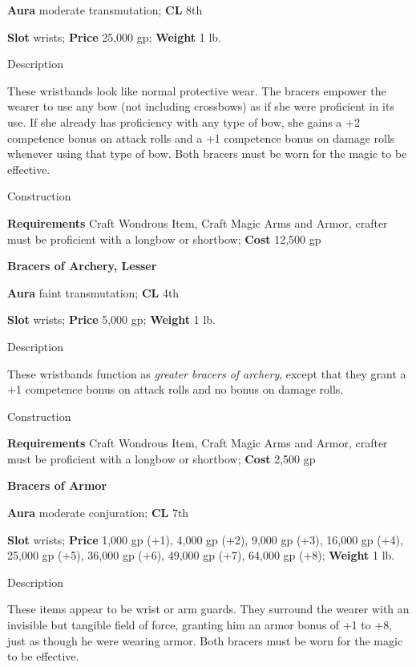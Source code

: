 \textbf{Aura} moderate transmutation;\textbf{ CL }8th
				
\textbf{Slot} wrists; \textbf{Price} 25,000 gp; \textbf{Weight} 1 lb.
				
Description
				
These wristbands look like normal protective wear. The bracers empower the wearer to use any bow (not including crossbows) as if she were proficient in its use. If she already has proficiency with any type of bow, she gains a +2 competence bonus on attack rolls and a +1 competence bonus on damage rolls whenever using that type of bow. Both bracers must be worn for the magic to be effective. 
				
Construction
				
\textbf{Requirements} Craft Wondrous Item, Craft Magic Arms and Armor, crafter must be proficient with a longbow or shortbow; \textbf{Cost }12,500 gp
				
\textbf{Bracers of Archery, Lesser}
				
\textbf{Aura} faint transmutation;\textbf{ CL }4th
				
\textbf{Slot} wrists; \textbf{Price} 5,000 gp; \textbf{Weight} 1 lb.
				
Description
				
These wristbands function as \textit{greater bracers of archery}, except that they grant a +1 competence bonus on attack rolls and no bonus on damage rolls. 
				
Construction
				
\textbf{Requirements} Craft Wondrous Item, Craft Magic Arms and Armor, crafter must be proficient with a longbow or shortbow; \textbf{Cost }2,500 gp
				
\textbf{Bracers of Armor}
				
\textbf{Aura} moderate conjuration;\textbf{ CL }7th
				
\textbf{Slot} wrists; \textbf{Price} 1,000 gp (+1), 4,000 gp (+2), 9,000 gp (+3), 16,000 gp (+4), 25,000 gp (+5), 36,000 gp (+6), 49,000 gp (+7), 64,000 gp (+8); \textbf{Weight} 1 lb.
				
Description
				
These items appear to be wrist or arm guards. They surround the wearer with an invisible but tangible field of force, granting him an armor bonus of +1 to +8, just as though he were wearing armor. Both bracers must be worn for the magic to be effective. 
				
